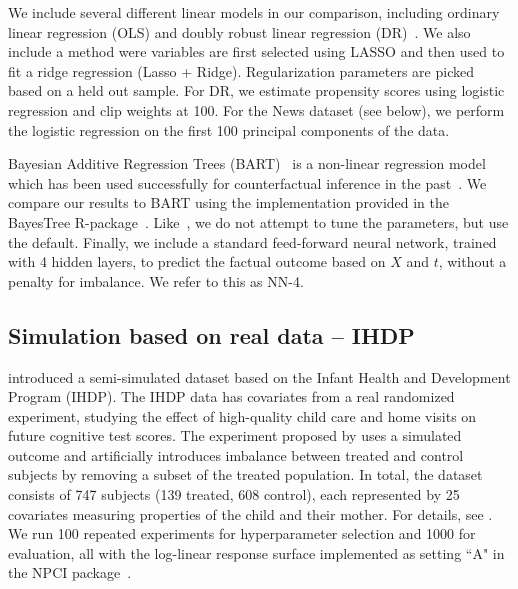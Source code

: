 We include several different linear models in our comparison, including ordinary linear regression ({\sc OLS}) and doubly robust linear regression (DR)~\cite{bang2005doubly}. We also include a method were variables are first selected using LASSO and then used to fit a ridge regression ({\sc Lasso + Ridge}). Regularization parameters are picked based on a held out sample. For DR, we estimate propensity scores using logistic regression and clip weights at 100. For the News dataset (see below), we perform the logistic regression on the first 100 principal components of the data.

Bayesian Additive Regression Trees (BART)~\cite{chipman2010bart} is a non-linear regression model which has been used successfully for counterfactual inference in the past~\cite{hill2011bayesian}. We compare our results to BART using the implementation provided in the BayesTree R-package~\cite{BayesTree}. Like~\cite{hill2011bayesian}, we do not attempt to tune the parameters, but use the default. Finally, we include a standard feed-forward neural network, trained with 4 hidden layers, to predict the factual outcome based on $X$ and $t$, without a penalty for imbalance. We refer to this as {\sc NN-4}.

\subsection{Simulation based on real data -- IHDP}
\citet{hill2011bayesian} introduced a semi-simulated dataset based on the Infant Health and Development Program (IHDP). The IHDP data has covariates from a real randomized experiment, studying the effect of high-quality child care and home visits on future cognitive test scores. The experiment proposed by \citet{hill2011bayesian} uses a simulated outcome and artificially introduces imbalance between treated and control subjects by removing a subset of the treated population. In total, the dataset consists of 747 subjects (139 treated, 608 control), each represented by 25 covariates measuring properties of the child and their mother. For details, see \citet{hill2011bayesian}. We run 100 repeated experiments for hyperparameter selection and 1000 for evaluation, all with the log-linear response surface implemented as setting ``A" in the NPCI package~\cite{npci}.

